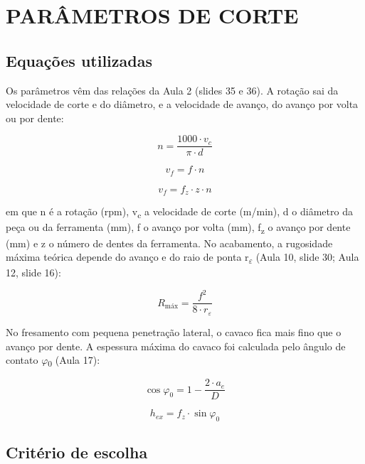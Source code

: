 \chapter{PARÂMETROS DE CORTE}\label{cap:param}

\section{Equações utilizadas}

Os parâmetros vêm das relações da Aula 2 (slides 35 e 36). A rotação sai da velocidade de corte e do diâmetro, e a velocidade de avanço, do avanço por volta ou por dente:

\begin{equation}\label{eq:n}
  n = \frac{1000 \cdot v_{c}}{\pi \cdot d}
\end{equation}

\begin{equation}\label{eq:vf}
  v_{f} = f \cdot n
\end{equation}

\begin{equation}\label{eq:vfz}
  v_{f} = f_{z} \cdot z \cdot n
\end{equation}

em que n é a rotação (rpm), v\textsubscript{c} a velocidade de corte (m/min), d o diâmetro da peça ou da ferramenta (mm), f o avanço por volta (mm), f\textsubscript{z} o avanço por dente (mm) e z o número de dentes da ferramenta. No acabamento, a rugosidade máxima teórica depende do avanço e do raio de ponta r\textsubscript{$\varepsilon$} (Aula 10, slide 30; Aula 12, slide 16):

\begin{equation}\label{eq:rmax}
  R_{\text{máx}} = \frac{f^{2}}{8 \cdot r_{\varepsilon}}
\end{equation}

No fresamento com pequena penetração lateral, o cavaco fica mais fino que o avanço por dente. A espessura máxima do cavaco foi calculada pelo ângulo de contato $\varphi$\textsubscript{0} (Aula 17):

\begin{equation}\label{eq:phi0}
  \cos \varphi_{0} = 1 - \frac{2 \cdot a_{e}}{D}
\end{equation}

\begin{equation}\label{eq:hex}
  h_{ex} = f_{z} \cdot \sin \varphi_{0}
\end{equation}

\section{Critério de escolha}


